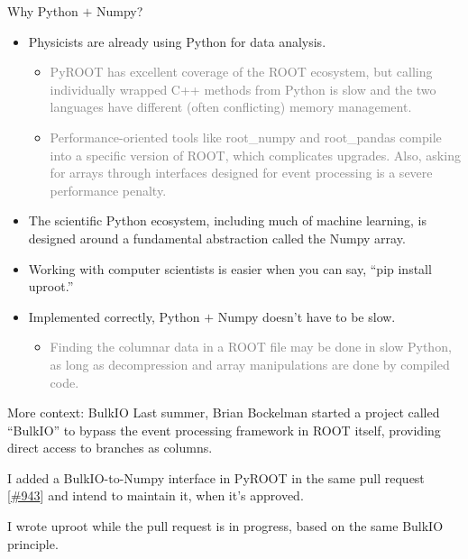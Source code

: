 \documentclass[aspectratio=169]{beamer}
\begin{document}
\begin{frame}{Why Python $+$ Numpy?}
\vspace{0.25 cm}
\begin{itemize}\setlength{\itemsep}{0.35 cm}
\item Physicists are already using Python for data analysis.

\begin{itemize}
\item \textcolor{gray}{PyROOT has excellent coverage of the ROOT ecosystem, but calling individually wrapped C++ methods from Python is slow and the two languages have different (often conflicting) memory management.}

\item \textcolor{gray}{Performance-oriented tools like root\_numpy and root\_pandas compile into a specific version of ROOT, which complicates upgrades. Also, asking for arrays through interfaces designed for event processing is a severe performance penalty.}
\end{itemize}

\item The scientific Python ecosystem, including much of machine learning, is designed around a fundamental abstraction called the Numpy array.

\item Working with computer scientists is easier when you can say, ``pip install uproot.''

\item Implemented correctly, Python $+$ Numpy doesn't have to be slow.

\begin{itemize}
\item \textcolor{gray}{Finding the columnar data in a ROOT file may be done in slow Python, as long as decompression and array manipulations are done by compiled code.}
\end{itemize}
\end{itemize}
\end{frame}

\begin{frame}{More context: BulkIO}
\vspace{0.75 cm}
Last summer, Brian Bockelman started a project called ``BulkIO'' to bypass the event processing framework in ROOT itself, providing direct access to branches as columns.

\vspace{0.75 cm}
I added a BulkIO-to-Numpy interface in PyROOT in the same pull request [\textcolor{blue}{\href{https://github.com/root-project/root/pull/943}{\#943}}] and intend to maintain it, when it's approved.

\vspace{0.75 cm}
I wrote uproot while the pull request is in progress, based on the same BulkIO principle.
\end{frame}
\end{document}
